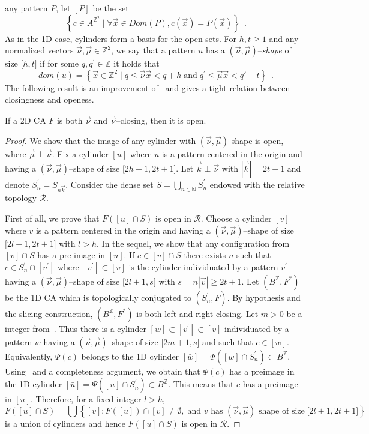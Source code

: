 \documentclass{llncs}
\newcommand{\z}{\ensuremath{\mathbb{Z}}\xspace}
\newcommand{\n}{\ensuremath{\mathbb{N}}\xspace}
\newcommand{\bz}{\ensuremath{B^{\mathbb{Z}}}\xspace}
\newcommand{\zdu}{\ensuremath{\mathbb{Z}^2}\xspace}
\newcommand{\azdu}{\ensuremath{A^{\zdu}}\xspace}
\newcommand{\set}[1]{\left\{#1\right\}}
\newcommand{\sh}[1]{\mathbf{[}#1\mathbf{]}} \newcommand{\zu}{\set{0,1}}
\newcommand{\para}[1]{(#1)}
\newcommand{\nn}{\vec\nu}
\newcommand{\kk}{\vec k}
\newcommand{\mm}{\vec \mu}
\newcommand{\xx}{\vec x}
\newcommand{\vv}{\vec v}
\begin{document}
any pattern $P$, let $[P]$ be the set
\[
\set{c\in\azdu\;|\;\forall\xx\in Dom(P), c(\xx)=P(\xx)}\enspace.
\]
As in the 1D case, cylinders form a basis for the open sets.
For $h,t\geq 1$ and any normalized vectors $\nn,\mm\in\zdu$,
we say that a pattern $u$ has a $(\nn,\mm)$--\emph{shape} of size
$\sh{h,t}$ if for some $q,q^\prime\in\z$ it holds that
\[
dom(u)=\set{\xx\in\zdu\;|\;q\leq \nn\xx< q+h
\;\text{and}\; q^\prime\leq \mm\xx<q'+t}\enspace.
\] 
The following result is an improvement of~\cite[Thm. 2]{dennunzio08}
and gives a tight relation between closingness and
openess.
\begin{theorem}\label{th:2closingopen}
  If a 2D CA $F$ is both $\nn$ and $\bar{\nn}$--closing,
  then it is open.
\end{theorem}
\begin{proof}
We show that the image of any cylinder with $(\nn,\mm)$
shape is open, where $\mm\perp\nn$. Fix a cylinder $[u]$ where $u$
is a pattern centered in the origin and having a
$(\nn,\mm)$--shape of size $\sh{2h+1,2t+1}$. Let $\kk\perp \nn$
with $|\kk|=2t+1$ and denote $S^\prime_n=S_{n\kk}$. Consider the
dense set $S=\bigcup_{n\in\n} S^\prime_n$ endowed with the relative
topology ${\mathcal R}$. 
\smallskip

First of all, we prove that $F([u]\cap
S)$ is open in ${\mathcal R}$.
Choose a cylinder $[v]$ where $v$ is a pattern centered in
the origin and having a $(\nn,\mm)$--shape of size
$\sh{2l+1,2t+1}$ with $l>h$. In the sequel, we show that any
configuration from $[v]\cap S$ has a pre-image in $[u]$. If $c\in
[v]\cap S$ there exists $n$ such that $c\in S^\prime_n\cap
[v^\prime]$ where $[v^\prime]\subset [v]$ is the cylinder
individuated by a pattern $v^\prime$ having a $(\nn,\mm)$--shape
of size $\sh{2l+1,s}$ with $s=n|\vv|\geq 2t+1$. Let $\para{\bz,
F^*}$ be the 1D CA which is topologically conjugated to
$\para{S^\prime_n, F}$. By hypothesis and the slicing
construction, $\para{\bz, F^*}$ is both left and right closing.
Let $m>0$ be a integer from~\cite[Prop. 5.44]{kurka04}. Thus there
is a cylinder $[w]\subset [v^\prime]\subset [v]$ individuated by a
pattern $w$ having a $(\nn,\mm)$--shape of size $\sh{2m+1,s}$ and
such that $c\in [w]$. Equivalently, $\Psi(c)$ belongs to the 1D
cylinder $[\bar{w}]=\Psi([w]\cap S^\prime_n)\subset\bz$.
Using~\cite[Prop. 5.44]{kurka04} and a completeness argument, we
obtain that $\Psi(c)$ has a preimage in the 1D cylinder
$[\bar{u}]=\Psi([u]\cap S^\prime_n)\subset\bz$. This means that
$c$ has a preimage in $[u]$. Therefore, for a fixed integer $l>h$,
   \[F([u]\cap S)=\bigcup\set{[v]:
   F([u])\cap[v]\ne\emptyset,\;\text{and $v$ has $(\nn,\mm)$ shape of size}\;\sh{2l+1,2t+1}}
   \]
is a union of cylinders and hence $F([u]\cap S)$ is open in 
${\mathcal R}$.
\smallskip


\end{proof}
\end{document}
